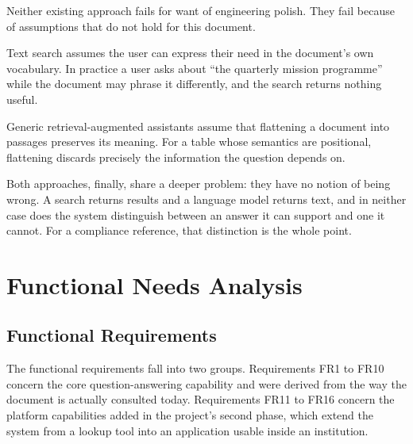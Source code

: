 Neither existing approach fails for want of engineering polish. They fail because of assumptions that do not hold for this document.

Text search assumes the user can express their need in the document's own vocabulary. In practice a user asks about ``the quarterly mission programme'' while the document may phrase it differently, and the search returns nothing useful.

Generic retrieval-augmented assistants assume that flattening a document into passages preserves its meaning. For a table whose semantics are positional, flattening discards precisely the information the question depends on.

Both approaches, finally, share a deeper problem: they have no notion of being wrong. A search returns results and a language model returns text, and in neither case does the system distinguish between an answer it can support and one it cannot. For a compliance reference, that distinction is the whole point.

\section{Functional Needs Analysis}

\subsection{Functional Requirements}

The functional requirements fall into two groups. Requirements FR1 to FR10 concern the core question-answering capability and were derived from the way the document is actually consulted today. Requirements FR11 to FR16 concern the platform capabilities added in the project's second phase, which extend the system from a lookup tool into an application usable inside an institution.

